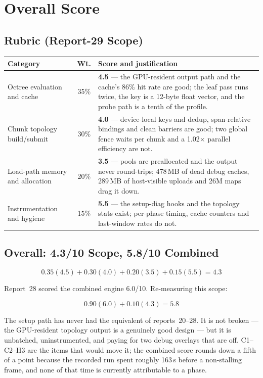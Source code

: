 \documentclass[11pt,a4paper]{article}
\begin{document}
\section{Overall Score}
\label{sec:score29}

\subsection{Rubric (Report-29 Scope)}

\begin{center}
\small
\begin{tabular}{@{}lcp{7.4cm}@{}}
\toprule
\textbf{Category} & \textbf{Wt.} & \textbf{Score and justification} \\
\midrule
Octree evaluation and cache & 35\% & \textbf{4.5} --- the GPU-resident
output path and the cache's 86\% hit rate are good; the leaf pass runs twice,
the key is a 12-byte float vector, and the probe path is a tenth of the
profile. \\
Chunk topology build/submit & 30\% & \textbf{4.0} --- device-local keys and
dedup, span-relative bindings and clean barriers are good; two global fence
waits per chunk and a 1.02$\times$ parallel efficiency are not. \\
Load-path memory and allocation & 20\% & \textbf{3.5} --- pools are
preallocated and the output never round-trips; 478\,MB of dead debug caches,
289\,MB of host-visible uploads and 26M maps drag it down. \\
Instrumentation and hygiene & 15\% & \textbf{5.5} --- the setup-diag hooks and
the topology stats exist; per-phase timing, cache counters and last-window
rates do not. \\
\bottomrule
\end{tabular}
\end{center}

\subsection{Overall: 4.3/10 Scope, 5.8/10 Combined}

\begin{equation}
0.35(4.5) + 0.30(4.0) + 0.20(3.5) + 0.15(5.5) = \mathbf{4.3}
\end{equation}

Report~28 scored the combined engine 6.0/10. Re-measuring this scope:

\begin{equation}
0.90(6.0) + 0.10(4.3) = \mathbf{5.8}
\end{equation}

The setup path has never had the equivalent of reports~20--28. It is not
broken --- the GPU-resident topology output is a genuinely good design ---
but it is unbatched, uninstrumented, and paying for two debug overlays that
are off. C1--C2--H3 are the items that would move it; the combined score
rounds down a fifth of a point because the recorded run spent roughly 163\,s
before a non-stalling frame, and none of that time is currently attributable
to a phase.
\end{document}

